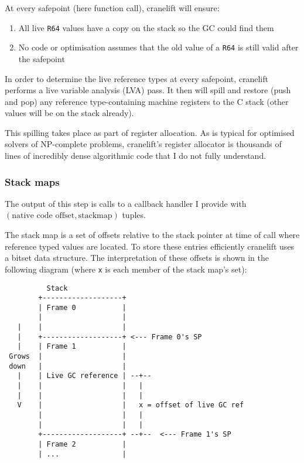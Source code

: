 At every safepoint (here function call), cranelift will ensure:

\begin{enumerate}
      \item All live \texttt{R64} values have a copy on the stack so the GC could find them
      \item No code or optimisation assumes that the old value of a \texttt{R64} is still valid
            after the safepoint
\end{enumerate}

In order to determine the live reference types at every safepoint, cranelift performs a live
variable analysis (LVA) pass. It then will spill and restore (push and pop) any reference
type-containing machine registers to the C stack (other values will be on the stack already).

This spilling takes place as part of register allocation. As is typical for optimised solvers of
NP-complete problems, cranelift's register allocator is thousands of lines of incredibly dense
algorithmic code that I do not fully understand.

\subsubsection{Stack maps}

The output of this step is calls to a callback handler I provide with \((\text{native code offset},
\text{stackmap})\)
tuples.

The stack map is a set of offsets relative to the stack pointer at time of call where reference
typed values are located. To store these entries efficiently cranelift uses a bitset data
structure. The interpretation of these offsets is shown in the following diagram (where \texttt{x}
is each member of the stack map's set):

\begin{verbatim}
          Stack
        +-------------------+
        | Frame 0           |
        |                   |
   |    |                   |
   |    +-------------------+ <--- Frame 0's SP
   |    | Frame 1           |
 Grows  |                   |
 down   |                   |
   |    | Live GC reference | --+--
   |    |                   |   |
   |    |                   |   |
   V    |                   |   x = offset of live GC ref
        |                   |   |
        |                   |   |
        +-------------------+ --+--  <--- Frame 1's SP
        | Frame 2           |
        | ...               |
\end{verbatim}

